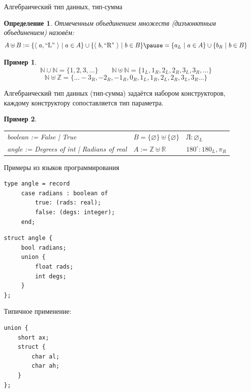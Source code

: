 \documentclass[aspectratio=169]{beamer}
\newtheorem{dfn}{Определение}[section]
\newtheorem{exm}{Пример}[section]
\begin{document}
\begin{frame}{Алгебраический тип данных, тип-сумма}

\begin{dfn}
Отмеченным объединением множеств (дизъюнктным объединением) назовём:\vspace{-0.3cm}
$$A \uplus B  :=\{ \langle\ a, \text{``L'' } \rangle\ |\ a \in A \} \cup \{ \langle\ b, \text{``R'' }\rangle \ |\ b \in B\}
 \pause= \{ a_L\ |\ a \in A\} \cup \{ b_R\ |\ b \in B\}$$
\end{dfn}\vspace{-1cm}

\pause\begin{exm}\vspace{-0.5cm}
$$\mathbb{N} \cup \mathbb{N} = \{ 1, 2,3,\dots\}\quad\quad\mathbb{N} \uplus \mathbb{N} = \{ 1_L, 1_R, 2_L, 2_R, 3_L, 3_R, \dots \} $$
\vspace{-0.7cm}
$$\mathbb{N} \uplus \mathbb{Z} = \{ \dots -3_R, -2_R, -1_R, 0_R, 1_L, 1_R, 2_L, 2_R, 3_L, 3_R \dots \}$$
\end{exm}

Алгебраический тип данных (тип-сумма) задаётся набором конструкторов, каждому конструктору сопоставляется тип параметра.

\begin{exm}
\begin{tabular}{lll}
boolean := False | True & $B = \{\varnothing\} \uplus \{\varnothing\}$ & $\text{Л}: \varnothing_L$\\
angle := Degrees of int | Radians of real    & $A := \mathbb{Z} \uplus \mathbb{R}$ & $180^\circ: 180_L, \pi_R$
\end{tabular}
\end{exm}

\end{frame}

\begin{frame}[fragile]{Примеры из языков программирования}

\begin{multicols}{2}
\begin{verbatim}
type angle = record
     case radians : boolean of
         true: (rads: real);
         false: (degs: integer);
     end;

\end{verbatim}

\begin{verbatim}
struct angle {
     bool radians;
     union {
         float rads;
         int degs;
     }
};
\end{verbatim}
\end{multicols}
\vspace{-0.7cm}
Типичное применение:
\vspace{-0.2cm}\begin{verbatim}
union {
    short ax;
    struct {
        char al;
        char ah;
    }
};
\end{verbatim}
\end{frame}
\end{document}
